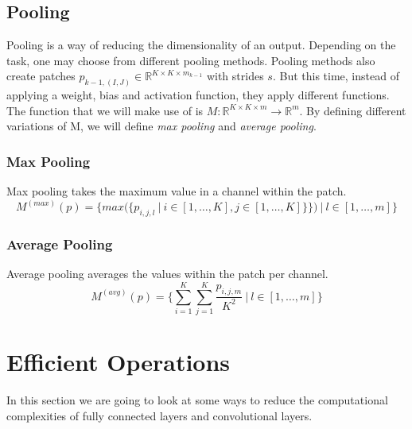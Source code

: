 \subsection{Pooling}
Pooling is a way of reducing the dimensionality of an output. Depending on the task, one may choose from different pooling methods. Pooling methods also create patches $p_{k-1,(I,J)} \in \mathbb{R}^{K \times K \times m_{k-1}}$ with strides $s$. But this time, instead of applying a weight, bias and activation function, they apply different functions. 
The function that we will make use of is $ M : \mathbb{R}^{K \times K \times m} \rightarrow \mathbb{R}^{m}$. By defining different variations of M, we will define \textit{max pooling} and \textit{average pooling}.
\subsubsection{Max Pooling}
Max pooling takes the maximum value in a channel within the patch.
$$ M^{(max)}(p) = \{max(\{p_{i,j,l} \ |\  i \in [1, \ldots, K],  j \in [1, \ldots, K] \}\}) \ |\  l \in [1, \ldots, m] \} $$
\subsubsection{Average Pooling}
Average pooling averages the values within the patch per channel. 
$$ M^{(avg)}(p) = \{\sum_{i=1}^{K}\sum_{j=1}^{K}\frac{p_{i,j,m}}{K^2} \ | \  l \in [1, \ldots, m] \} $$



\section{Efficient Operations}
In this section we are going to look at some ways to reduce the computational complexities of fully connected layers and convolutional layers. 

